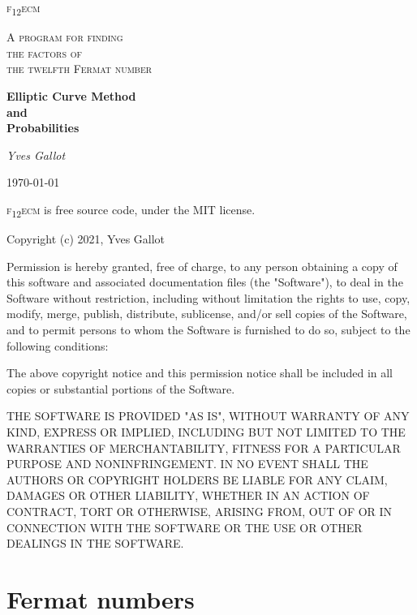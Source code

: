 \documentclass[a4paper, 11pt, pdftex]{report}
\theoremstyle{plain}
\theoremstyle{definition}
\begin{document}
\begin{titlepage}
	\centering
	\vspace*{2cm}
	{\scshape\Huge f\textsubscript{12}ecm\par}
	\vspace{2cm}
	{\scshape\Large A program for finding\\the factors of\\the twelfth Fermat number\par}
	\vspace{4cm}
	{\huge\bfseries Elliptic Curve Method\\and\\Probabilities\par}
	\vspace{4cm}
	{\Large\itshape Yves Gallot\par}
	\vfill
	{\large \today\par}
\end{titlepage}

\vspace*{2cm}
{\scshape f\textsubscript{12}ecm} is free source code, under the MIT license.

Copyright (c) 2021, Yves Gallot

Permission is hereby granted, free of charge, to any person obtaining a copy
of this software and associated documentation files (the "Software"), to deal
in the Software without restriction, including without limitation the rights
to use, copy, modify, merge, publish, distribute, sublicense, and/or sell
copies of the Software, and to permit persons to whom the Software is
furnished to do so, subject to the following conditions:

The above copyright notice and this permission notice shall be included in
all copies or substantial portions of the Software.

THE SOFTWARE IS PROVIDED "AS IS", WITHOUT WARRANTY OF ANY KIND, EXPRESS OR
IMPLIED, INCLUDING BUT NOT LIMITED TO THE WARRANTIES OF MERCHANTABILITY,
FITNESS FOR A PARTICULAR PURPOSE AND NONINFRINGEMENT. IN NO EVENT SHALL THE
AUTHORS OR COPYRIGHT HOLDERS BE LIABLE FOR ANY CLAIM, DAMAGES OR OTHER
LIABILITY, WHETHER IN AN ACTION OF CONTRACT, TORT OR OTHERWISE, ARISING FROM,
OUT OF OR IN CONNECTION WITH THE SOFTWARE OR THE USE OR OTHER DEALINGS IN
THE SOFTWARE.


\chapter{Fermat numbers}
\end{document}

